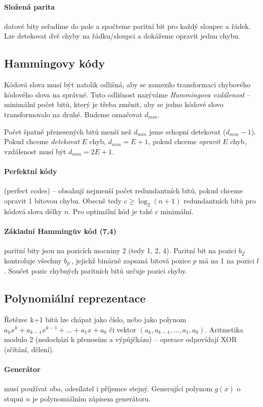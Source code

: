\documentclass[a4paper, 11pt]{report}
\begin{document}
\paragraph{Složená parita} datové bity seřadíme do pole a spočteme paritní bit pro každý sloupec a řádek. Lze detekovat dvě chyby na řádku/sloupci a dokážeme opravit jednu chybu.

\subsection{Hammingovy kódy}
Kódová slova musí být natolik odlišná, aby se zamezilo transformaci chybového kódového slova na správné. Tuto odlišnost nazýváme \emph{Hammingova vzdálenost} -- minimální počet bitů, který je třeba změnit, aby se jedno kódové slovo transformovalo na druhé. Budeme označovat $d_{min}$.

Počet špatně přenesených bitů menší než $d_{min}$ jsme schopni detekovat ($d_{min} - 1$). Pokud chceme \emph{detekovat} $E$ chyb, $d_{min} = E+1$, pokud chceme \emph{opravit} $E$ chyb, vzdálenost musí být $d_{min} = 2E + 1$.

\paragraph{Perfektní kódy} (perfect codes) -- obsahují nejmenší počet redundantních bitů, pokud chceme opravit 1 bitovou chybu. Obecně tedy $c \geq \log_2(n+1)$ redundantních bitů pro kódová slova délky $n$. Pro optimální kód je také $c$ minimální.

\paragraph{Základní Hammingův kód (7,4)} paritní bity jsou na pozicích mocniny 2 (tedy 1, 2, 4). Paritní bit na pozici $b_{2^l}$ kontroluje všechny $b_{p'}$, jejichž binárně zapsaná bitová pozice $p$ má na 1 na pozici $l$. Součet pozic chybných paritních bitů určuje pozici chyby.

\subsection{Polynomiální reprezentace}
Řetězec k+1 bitů lze chápat jako číslo, nebo jako polynom $a_kx^k + a_{k-1}x^{k-1} + \dots + a_1x + a_0$ či vektor $(a_k, a_{k-1}, \dots, a_1, a_0)$. Aritmetika modulo 2 (nedochází k přenosům a výpůjčkám) -- operace odpovídají XOR (sčítání, dělení).

\paragraph{Generátor} musí používat oba, odesílatel i příjemce stejný. Generující polynom $g(x)$ o stupni $n$ je polynomiálním zápisem generátoru.
\end{document}
